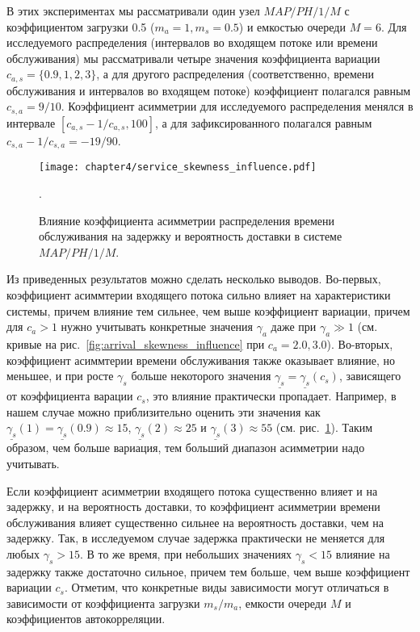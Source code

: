 В этих экспериментах мы рассматривали один узел $MAP/PH/1/M$ с коэффициентом загрузки 0.5 ($m_a = 1, m_s = 0.5$) и емкостью очереди $M = 6$. Для исследуемого распределения (интервалов во входящем потоке или времени обслуживания) мы рассматривали четыре значения коэффициента вариации $c_{a,s} = \{0.9, 1, 2, 3\}$, а для другого распределения (соответственно, времени обслуживания и интервалов во входящем потоке) коэффициент полагался равным $c_{s,a} = 9/10$. Коэффициент асимметрии для исследуемого распределения менялся в интервале $[c_{a,s} - 1/c_{a,s}, 100]$, а для зафиксированного полагался равным $c_{s,a} - 1/c_{s,a} = -19/90$.

\begin{figure}[h]
    \texttt{[image: chapter4/service\_skewness\_influence.pdf]}
    \caption{Влияние коэффициента асимметрии распределения времени обслуживания на задержку и вероятность доставки в системе $MAP/PH/1/M$.}.\label{fig:service_skewness_influence}
\end{figure}

Из приведенных результатов можно сделать несколько выводов. Во-первых, коэффициент асиммтерии входящего потока сильно влияет на характеристики системы, причем влияние тем сильнее, чем выше коэффициент вариации, причем для $c_a > 1$ нужно учитывать конкретные значения $\gamma_a$ даже при $\gamma_a \gg 1$ (см. кривые на рис.~\ref{fig:arrival_skewness_influence} при $c_a = 2.0, 3.0$). Во-вторых, коэффициент асиммтерии времени обслуживания также оказывает влияние, но меньшее, и при росте $\gamma_s$ больше некоторого значения $\underline{\gamma_s} = \underline{\gamma_s}(c_s)$, зависящего от коэффициента варации $c_s$, это влияние практически пропадает. Например, в нашем случае можно приблизительно оценить эти значения как $\underline{\gamma_s}(1) = \underline{\gamma_s}(0.9) \approx 15$, $\underline{\gamma_s}(2) \approx 25$ и $\underline{\gamma_s}(3) \approx 55$ (см. рис.~\ref{fig:service_skewness_influence}). Таким образом, чем больше вариация, тем больший диапазон асимметрии надо учитывать.

Если коэффициент асимметрии входящего потока существенно влияет и на задержку, и на вероятность доставки, то коэффициент асимметрии времени обслуживания влияет существенно сильнее на вероятность доставки, чем на задержку. Так, в исследуемом случае задержка практически не меняется для любых $\gamma_s > 15$. В то же время, при небольших значениях $\gamma_s < 15$ влияние на задержку также достаточно сильное, причем тем больше, чем выше коэффициент вариации $c_s$. Отметим, что конкретные виды зависимости могут отличаться в зависимости от коэффициента загрузки $m_s / m_a$, емкости очереди $M$ и коэффициентов автокорреляции.

